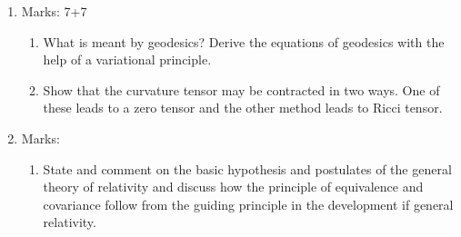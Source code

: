 \documentclass[../main-sheet.tex]{subfiles}
\begin{document}
\begin{enumerate}
\begin{enumerate}
    \end{enumerate}
    \item Marks: 7+7
    \begin{enumerate}
        \item What is meant by geodesics? Derive the equations of geodesics with the help of a variational principle.
        \item Show that the curvature tensor may be contracted in two ways. One of these leads to a zero tensor and the other method leads to Ricci tensor.
    \end{enumerate}
    \item Marks:
    \begin{enumerate}
        \item State and comment on the basic hypothesis and postulates of the general theory of relativity and discuss how the principle of equivalence and covariance follow from the guiding principle in the development if general relativity.


\end{enumerate}
\end{enumerate}
\end{document}
